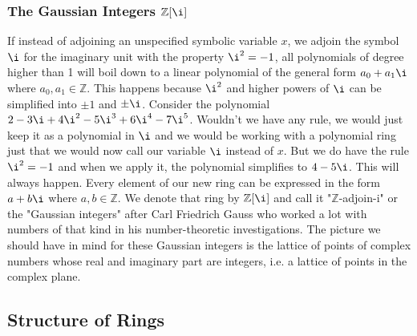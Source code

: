 \subsubsection{The Gaussian Integers $\mathbb{Z}[\i]$}
If instead of adjoining an unspecified symbolic variable $x$, we adjoin the symbol $\i$ for the imaginary unit with the property $\i^2 = -1$, all polynomials of degree higher than 1 will boil down to a linear polynomial of the general form $a_0 + a_1 \i$ where $a_0,a_1 \in \mathbb{Z}$. This happens because $\i^2$ and higher powers of $\i$ can be simplified into $\pm 1$ and $\pm \i$. Consider the polynomial $2 - 3 \i + 4 \i^2 - 5 \i^3 + 6 \i^4 - 7 \i^5$. Wouldn't we have any rule, we would just keep it as a polynomial in $\i$ and we would be working with a polynomial ring just that we would now call our variable $\i$ instead of $x$. But we do have the rule $\i^2 = -1$ and when we apply it, the polynomial simplifies to $4 - 5 \i$. This will always happen. Every element of our new ring can be expressed in the form $a + b \i$ where $a,b \in \mathbb{Z}$. We denote that ring by $\mathbb{Z}[\i]$ and call it "$\mathbb{Z}$-adjoin-i" or the "Gaussian integers" after Carl Friedrich Gauss who worked a lot with numbers of that kind in his number-theoretic investigations. The picture we should have in mind for these Gaussian integers is the lattice of points of complex numbers whose real and imaginary part are integers, i.e. a lattice of points in the complex plane.


\subsection{Structure of Rings}



